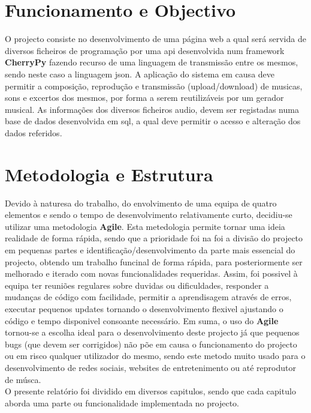 \section{Funcionamento e Objectivo}
\label{sec.funcionamento_objectivos}
O projecto consiste no desenvolvimento de uma página \ac{web} a qual será servida de diversos ficheiros de programação por uma \ac{api} desenvolvida num framework \textbf{CherryPy} fazendo recurso de uma linguagem de transmissão entre os mesmos, sendo neste caso a linguagem \ac{json}. A aplicação do sistema em causa deve permitir a composição, reprodução e transmissão (upload/download) de musicas, sons e excertos dos mesmos, por forma a serem reutilizáveis por um gerador musical. As informações dos diversos ficheiros audio, devem ser registadas numa base de dados desenvolvida em \ac{sql}, a qual deve permitir o acesso e alteração dos dados referidos.

\section{Metodologia e Estrutura}
Devido à naturesa do trabalho, do envolvimento de uma equipa de quatro elementos e sendo o tempo de desenvolvimento relativamente curto, decidiu-se utilizar uma metodologia \textbf{Agile}. Esta metedologia permite tornar uma ideia realidade de forma rápida, sendo que a prioridade foi na foi a divisão do projecto em pequenas partes e identificação/desenvolvimento da parte mais essencial do projecto, obtendo um trabalho funcinal de forma rápida, para posteriormente ser melhorado e iterado com novas funcionalidades requeridas. Assim, foi possivel à equipa ter reuniões regulares sobre duvidas ou dificuldades, responder a mudanças de código com facilidade, permitir a aprendisagem através de erros, executar pequenos updates tornando o desenvolvimento flexivel ajustando o código e tempo disponivel consoante necessário. Em suma, o uso do \textbf{Agile} tornou-se a escolha ideal para o desenvolvimento deste projecto já que pequenos bugs (que devem ser corrigidos) não põe em causa o funcionamento do projecto ou em risco qualquer utilizador do mesmo, sendo este metodo muito usado para o desenvolvimento de redes sociais, websites de entretenimento ou até reprodutor de músca. \\
O presente relatório foi dividido em diversos capitulos, sendo que cada capitulo aborda uma parte ou funcionalidade implementada no projecto.


\label{sec.metodologia_estrutura}

